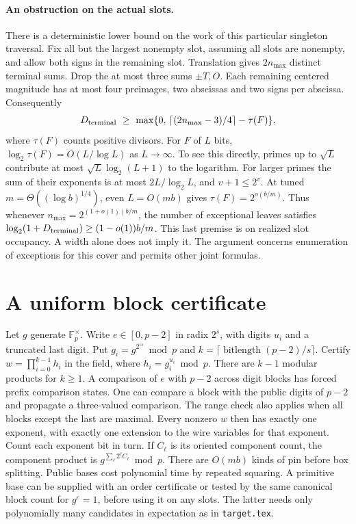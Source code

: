 \documentclass[11pt]{article}
\newcommand{\Fp}{\mathbb F_p}
\begin{document}
\paragraph{An obstruction on the actual slots.}
There is a deterministic lower bound on the work of this particular
singleton traversal. Fix all but the largest nonempty slot, assuming
all slots are nonempty, and allow both signs in the remaining slot.
Translation gives $2n_{\max}$ distinct terminal sums. Drop the at most
three sums $\pm T,O$. Each remaining centered magnitude has at most
four preimages, two abscissas and two signs per abscissa. Consequently
\[
 D_{\rm terminal}\ \ge\
 \max\{0,\,\lceil(2n_{\max}-3)/4\rceil-\tau(F)\},
\]
where $\tau(F)$ counts positive divisors. For $F$ of $L$ bits,
$\log_2\tau(F)=O(L/\log L)$ as $L\to\infty$. To see this directly,
primes up to $\sqrt L$ contribute at most
$\sqrt L\log_2(L+1)$ to the logarithm. For larger primes the sum of
their exponents is at most $2L/\log_2 L$, and $v+1\le 2^v$.
At tuned $m=\Theta((\log b)^{1/4})$, even $L=O(mb)$ gives
$\tau(F)=2^{o(b/m)}$. Thus whenever $n_{\max}=2^{(1+o(1))b/m}$,
the number of exceptional leaves satisfies
$\log_2(1+D_{\rm terminal})\ge(1-o(1))b/m$. This last premise is on realized
slot occupancy. A width alone does not imply it. The argument concerns
enumeration of exceptions for this cover and permits other joint formulas.

\section{A uniform block certificate}
Let $g$ generate $\Fp^\times$. Write $e\in[0,p-2]$ in radix $2^s$,
with digits $u_i$ and a truncated last digit. Put
$g_i=g^{2^{is}}\bmod p$ and $k=\lceil\operatorname{bitlength}(p-2)/s\rceil$.
Certify $w=\prod_{i=0}^{k-1}h_i$ in the field, where
$h_i=g_i^{u_i}\bmod p$. There are $k-1$ modular products for $k\ge1$.
A comparison of $e$ with $p-2$ across digit blocks has forced
prefix comparison states. One can compare a block with the public
digits of $p-2$ and propagate a three-valued comparison. The range
check also applies when all blocks except the last are maximal.
Every nonzero $w$ then has exactly one exponent, with exactly one
extension to the wire variables for that exponent. Count each exponent
bit in turn. If $C_\ell$ is its oriented component count, the component
product is $g^{\sum_\ell 2^\ell C_\ell}\bmod p$.
There are $O(mb)$ kinds of pin before box splitting.
Public bases cost polynomial time by repeated squaring. A primitive
base can be supplied with an order certificate or tested by the same
canonical block count for $g^e=1$, before using it on any slots.
The latter needs only polynomially many candidates in expectation as
in \texttt{target.tex}.
\end{document}
